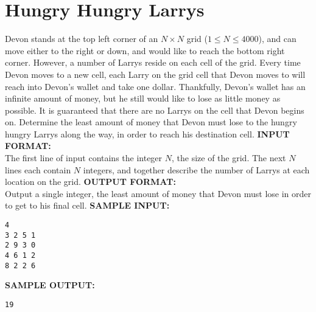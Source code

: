 \documentclass{article}
\begin{document}
\newcommand{\blank}{\vskip 3mm}
\setlength\parindent{0pt}
\renewcommand\thesection{\Alph{section}}

\setcounter{section}{8}
\section{Hungry Hungry Larrys}

Devon stands at the top left corner of an $ N \times N $ grid ($ 1 \leq N \leq 4000 $), and can move either to the right or down, and would like to reach the bottom right corner.  However, a number of Larrys reside on each cell of the grid.  Every time Devon moves to a new cell, each Larry on the grid cell that Devon moves to will reach into Devon’s wallet and take one dollar.  Thankfully, Devon’s wallet has an infinite amount of money, but he still would like to lose as little money as possible.  It is guaranteed that there are no Larrys on the cell that Devon begins on.  Determine the least amount of money that Devon must lose to the hungry hungry Larrys along the way, in order to reach his destination cell.
\blank
\textbf{INPUT FORMAT:}\\
The first line of input contains the integer $ N $, the size of the grid.  The next $ N $ lines each contain $ N $ integers, and together describe the number of Larrys at each location on the grid.
\blank
\textbf{OUTPUT FORMAT:}\\
Output a single integer, the least amount of money that Devon must lose in order to get to his final cell.
\blank
\textbf{SAMPLE INPUT:}
\begin{verbatim}
4
3 2 5 1
2 9 3 0
4 6 1 2
8 2 2 6
\end{verbatim}
\textbf{SAMPLE OUTPUT:}
\begin{verbatim}
19
\end{verbatim}
\newpage
\end{document}
